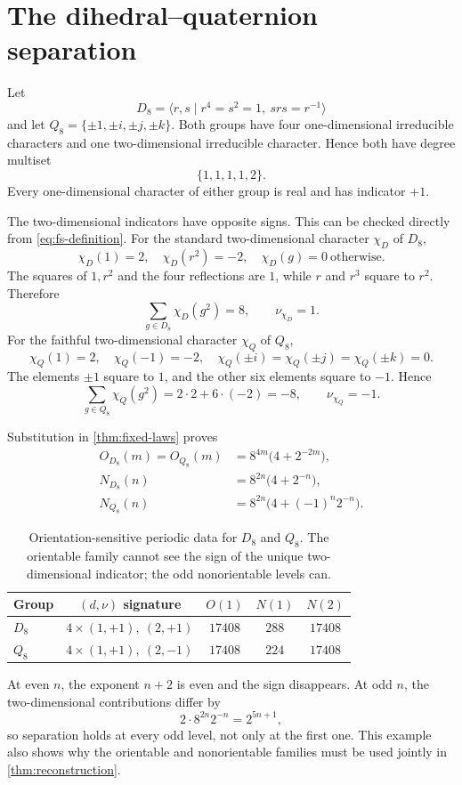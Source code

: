 \section{The dihedral--quaternion separation}
\label{sec:d8q8}

Let
\[
 D_8=\langle r,s\mid r^4=s^2=1,\ srs=r^{-1}\rangle
\]
and let $Q_8=\{\pm1,\pm i,\pm j,\pm k\}$.  Both groups have four
one-dimensional irreducible characters and one two-dimensional irreducible
character.  Hence both have degree multiset
\[
 \{1,1,1,1,2\}.
\]
Every one-dimensional character of either group is real and has indicator
$+1$.

The two-dimensional indicators have opposite signs.  This can be checked
directly from \eqref{eq:fs-definition}.  For the standard two-dimensional
character $\chi_D$ of $D_8$,
\[
 \chi_D(1)=2,\quad \chi_D(r^2)=-2,
 \quad \chi_D(g)=0\ \text{otherwise}.
\]
The squares of $1,r^2$ and the four reflections are $1$, while $r$ and $r^3$
square to $r^2$.  Therefore
\[
 \sum_{g\in D_8}\chi_D(g^2)=8,
 \qquad \nu_{\chi_D}=1.
\]
For the faithful two-dimensional character $\chi_Q$ of $Q_8$,
\[
 \chi_Q(1)=2,\quad \chi_Q(-1)=-2,
 \quad \chi_Q(\pm i)=\chi_Q(\pm j)=\chi_Q(\pm k)=0.
\]
The elements $\pm1$ square to $1$, and the other six elements square to
$-1$.  Hence
\[
 \sum_{g\in Q_8}\chi_Q(g^2)=2\cdot2+6\cdot(-2)=-8,
 \qquad \nu_{\chi_Q}=-1.
\]

Substitution in \cref{thm:fixed-laws} proves
\begin{align}
 O_{D_8}(m)=O_{Q_8}(m)
 &=8^{4m}\bigl(4+2^{-2m}\bigr),
 \label{eq:d8q8-O}\\
 N_{D_8}(n)&=8^{2n}\bigl(4+2^{-n}\bigr),
 \label{eq:d8-N}\\
 N_{Q_8}(n)&=8^{2n}\bigl(4+(-1)^n2^{-n}\bigr).
 \label{eq:q8-N}
\end{align}

\begin{table}[t]
\centering
\caption{Orientation-sensitive periodic data for $D_8$ and $Q_8$.  The
orientable family cannot see the sign of the unique two-dimensional
indicator; the odd nonorientable levels can.}
\label{tab:d8q8}
\begin{tabular}{@{}l c c c c@{}}
\toprule
Group & $(d,\nu)$ signature & $O(1)$ & $N(1)$ & $N(2)$ \\
\midrule
$D_8$ & $4\times(1,+1),\ (2,+1)$ & $17408$ & $288$ & $17408$ \\
$Q_8$ & $4\times(1,+1),\ (2,-1)$ & $17408$ & $224$ & $17408$ \\
\bottomrule
\end{tabular}
\end{table}

At even $n$, the exponent $n+2$ is even and the sign disappears.  At odd
$n$, the two-dimensional contributions differ by
\[
 2\cdot8^{2n}2^{-n}=2^{5n+1},
\]
so separation holds at every odd level, not only at the first one.  This
example also shows why the orientable and nonorientable families must be used
jointly in \cref{thm:reconstruction}.

